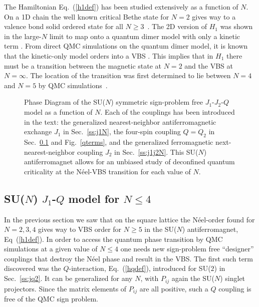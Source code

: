 \documentclass[range]{ar2e}
\begin{document}
The Hamiltonian Eq.~(\ref{h1def})
has been studied extensively as a function of $N$. On a 1D chain the well known critical Bethe state for $N=2$ gives way to a 
valence bond solid ordered state for all $N\geq 3$~\cite{barber1989:d1n3_vbs,klumper1989:d1n3_vbs,affleck1985:lgN}. The 2D version of $H_{1}$ was shown 
in the large-$N$ limit to map onto a quantum dimer model with only a kinetic term \cite{read1989:nucphysB}. From direct QMC simulations on the quantum dimer model, 
it is known that the kinetic-only model orders into a VBS \cite{sachdev1989:qd_vbs}.  This implies that in $H_{1}$ there must be a transition between the 
magnetic state at $N=2$ and the VBS at $N=\infty$.  The location of the transition was first determined to lie between $N=4$ and $N=5$ 
by QMC simulations~\cite{harada2003:sun}.

\begin{figure}
\centerline{}
  \caption{ \label{fig:pdj1j2q} Phase Diagram of the SU($N$) symmetric sign-problem free
    $J_1$-$J_2$-$Q$ model as a function of $N$. Each of the couplings has been introduced
    in the text: the generalized nearest-neighbor antiferromagnetic exchange $J_1$ in Sec.~\ref{ss:j1N}, the four-spin coupling $Q=Q_2$ in 
    Sec.~\ref{ss:jqN} and Fig.~\ref{qterms}, and the generalized ferromagnetic next-nearest-neighbor coupling $J_2$ in Sec.~\ref{ss:j1j2N}. 
    This SU($N$) antiferromagnet allows for an unbiased study of deconfined quantum
    criticality at the N\'eel-VBS transition for each value of $N$. }
\end{figure}


\subsection{SU($N$) $J_1$-$Q$ model for $N\leq 4$}
\label{ss:jqN}
In the previous section we saw that on the square lattice the N\'eel-order found for $N=2,3,4$ gives way to VBS
order for $N\geq 5$ in the SU($N$) antiferromagnet, Eq~(\ref{h1def}). In order to access the quantum phase transition by QMC simulations at a 
given value of $N\leq 4$ one needs new sign-problem free ``designer'' couplings that destroy the N\'eel phase and result in the VBS. The first such term discovered 
was the $Q$-interaction, Eq.~(\ref{hqdef}), introduced for SU($2$) in Sec.~\ref{ss:jq2}. It can be generalized for any $N$, with $P_{ij}$ again 
the SU($N$) singlet projectors. Since the matrix elements of $P_{ij}$ are all positive, such a $Q$ coupling is free of the QMC sign problem. 
\end{document}
